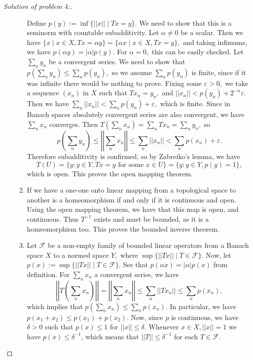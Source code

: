 \documentclass[letterpaper,11pt,twoside]{article}
\theoremstyle{proposition}
\theoremstyle{definition}
\theoremstyle{theorem}
\theoremstyle{definition}
\theoremstyle{definition}
\theoremstyle{definition}
\theoremstyle{lemma}
\theoremstyle{definition}
\theoremstyle{definition}
\theoremstyle{corollary}
\theoremstyle{definition}
\theoremstyle{definition}
\theoremstyle{definition}
\newcommand{\abs}[1]{\left \vert #1 \right \vert}
\newcommand{\norm}[1]{\left \vert \left \vert #1 \right \vert \right \vert}
\renewcommand{\div}{\;\vert\;}
\begin{document}
\begin{proof}[Solution of problem $4$:]
\begin{enumerate}
\begin{enumerate}
 		Define $p(y) := \inf \{ \norm{x} \div Tx=y \}.$ We need to show that this is a seminorm with countable subadditivity. Let $\alpha \neq 0$ be a 
 		scalar. 
 		Then we have $\{x \div x \in X, Tx=\alpha y\}= \{\alpha x \div x \in X, Tx=y\},$ and taking infimums, we have $p(\alpha y) = \abs{\alpha} p(y).$ For 
 		$\alpha =0,$ this can be easily checked. Let $\sum_n y_n$ be a convergent series. We need to show that $p\left( \sum_n y_n \right) \leq \sum_n 
 		p(y_n),$ 
 		so we assume $\sum_n p(y_n)$ is finite, since if it was infinite there would be nothing to prove. Fixing some $\varepsilon >0,$ we take a sequence 
 		$(x_n)$ in $X$ such that $Tx_n=y_n,$ and $ \norm{x_n} < p(y_n) + 2^{-n} \varepsilon.$ Then we have $\sum_n \norm{x_n} < \sum_n p(y_n) + 
 		\varepsilon,$ 
 		which is finite. Since in Banach spaces absolutely convergent series are also convergent, we have $\sum_n x_n$ converges. Then $T(\sum_n x_n)= 
 		\sum_n Tx_n= \sum_n y_n,$ so $$ p \left( \sum_n y_n \right) \leq  \norm{\sum_n x_n}  \leq \sum_n \norm{x_n} < \sum_n p(x_n) + \varepsilon.$$ 
 		Therefore subadditivity is confirmed, so by Zabreiko's lemma, we have $$T(U)= \{ y: y \in Y, Tx=y \text{ for some } x \in U \}= \{ y: y \in Y, 
 		p(y)=1 \},$$ which is open. This proves the open mapping theorem.
 		\item 	If we have a one-one onto linear mapping from a topological space to another is a homeomorphism if and only if it is continuous and open. 
 		Using the open mapping theorem, we have that this map is open, and continuous. Thus $T^{-1}$ exists and must be bounded, as it is a homeomorphism 
 		too. This proves the bounded inverse theorem.
 		
 		\item 	Let $\mathcal{F}$ be a non-empty family of bounded linear operators from a Banach space $X$ to a normed space $Y,$ where $\sup\{ \norm{Tx} 
 		\div T \in \mathcal{F} \}.$ Now, let  $p(x):= \sup \{\norm{Tx}\div T \in \mathcal{F}\}.$ See that $p(\alpha x) = \abs{\alpha} p(x)$ from definition. 
 		For $\sum_n x_n$ a convergent series, we have $$ \norm{ T \left( \sum_n x_n \right)} = \norm{ \sum_n x_n } \leq \sum_n \norm{Tx_n} \leq \sum_n 
 		p(x_n),$$ which implies that $p \left( \sum_n x_n\right) \leq \sum_n p(x_n).$ In particular, we have $p(x_1+x_2) \leq p(x_1) + p(x_2).$ Now, since 
 		$p$ is continuous, we have $\delta > 0$ such that $p(x) \leq 1$  for $\norm{x} \leq \delta.$ Whenever $x \in X, \norm{x}=1$ we have $p(x) \leq 
 		\delta^{-1}$,  which means that $\norm{T} \leq \delta^{-1}$ for each $T \in \mathcal{F}.$ 
 		

\end{enumerate}
\end{enumerate}
\end{proof}
\end{document}
